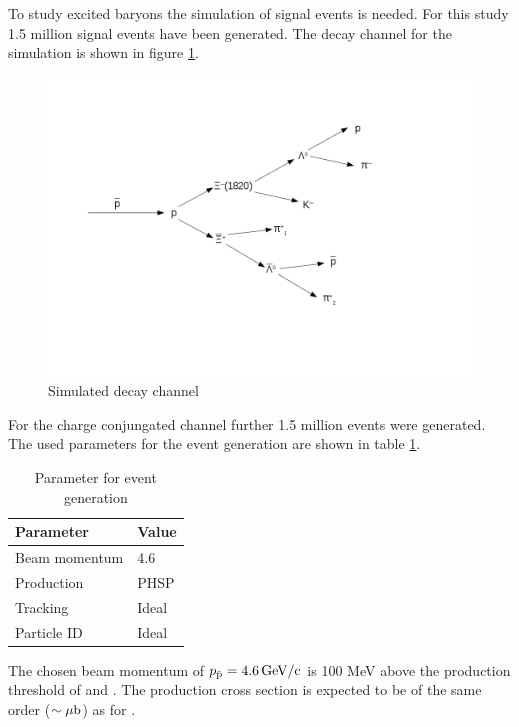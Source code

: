 To study excited \cascade baryons the simulation of signal events is needed.
For this study 1.5 million signal events have been generated.
The decay channel for the simulation is shown in figure \ref{fig:eventgeneration_decaychannel}. 

\begin{figure}[htbp]
	\centering
			\includegraphics[width=1.00\textwidth]{./plots/DecayChannelXi1820.png}
	\caption{Simulated decay channel}
	\label{fig:eventgeneration_decaychannel}
\end{figure}

For the charge conjungated channel further 1.5 million events were generated.
The used parameters for the event generation are shown in table \ref{tab:eventgeneration_parameter}.

\begin{table}[tbp]
	\caption{Parameter for event generation}
	\label{tab:eventgeneration_parameter}
	\centering
	\begin{tabular}{ll}
		\hline
		Parameter & Value \\
		\hline
		\hline
		Beam momentum & 4.6 \massunit \\
		Production & PHSP \\
		Tracking & Ideal \\
		Particle ID & Ideal \\\hline
		 
	\end{tabular}
\end{table}

The chosen beam momentum of $p_{\bar{\textnormal{p}}} = 4.6\, \textnormal{GeV/c}$ is 100 MeV above the production threshold of \excitedcascade and \anticascade.
The production cross section is expected to be of the same order ($\sim \mu\textnormal{b}$) as for \cascade \cite{PANDAphysics2009}.\\
\vspace{11pt} 

